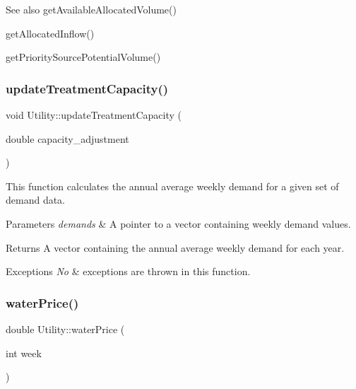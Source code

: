\begin{DoxySeeAlso}{See also}
get\+Available\+Allocated\+Volume() 

get\+Allocated\+Inflow() 

get\+Priority\+Source\+Potential\+Volume() 
\end{DoxySeeAlso}
\mbox{\label{classUtility_ae0134c9627b79067e1789c95c775570d}} 
\subsubsection{\texorpdfstring{update\+Treatment\+Capacity()}{updateTreatmentCapacity()}}
{\footnotesize\ttfamily void Utility\+::update\+Treatment\+Capacity (\begin{DoxyParamCaption}\item[{double}]{capacity\+\_\+adjustment }\end{DoxyParamCaption})}



This function calculates the annual average weekly demand for a given set of demand data. 


\begin{DoxyParams}{Parameters}
{\em demands} & A pointer to a vector containing weekly demand values. \\
\hline
\end{DoxyParams}
\begin{DoxyReturn}{Returns}
A vector containing the annual average weekly demand for each year.
\end{DoxyReturn}

\begin{DoxyExceptions}{Exceptions}
{\em No} & exceptions are thrown in this function. \\
\hline
\end{DoxyExceptions}
\mbox{\label{classUtility_a0dca2586b9ed761cdab3b0a344daf21c}} 
\subsubsection{\texorpdfstring{water\+Price()}{waterPrice()}}
{\footnotesize\ttfamily double Utility\+::water\+Price (\begin{DoxyParamCaption}\item[{int}]{week }\end{DoxyParamCaption})}



